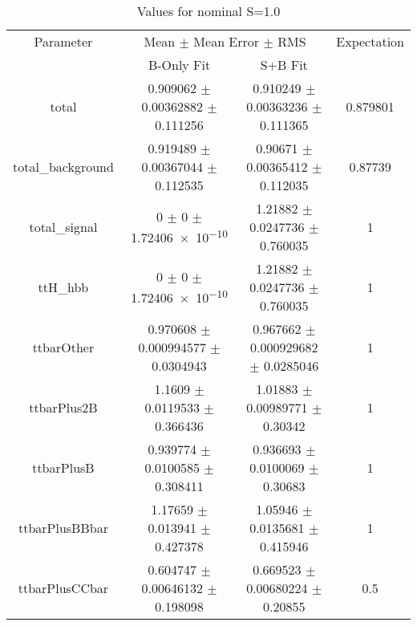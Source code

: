 \begin{table}
\centering
\caption{Values for nominal S=1.0}
\begin{tabular}{cccc}
\toprule
Parameter & \multicolumn{2}{c}{Mean $\pm$ Mean Error $\pm$ RMS} & Expectation\\
 & B-Only Fit & S+B Fit & \\
\midrule
total & \num{0.909062} $\pm$ \num{0.00362882} $\pm$ \num{0.111256} & \num{0.910249} $\pm$ \num{0.00363236} $\pm$ \num{0.111365} & \num{0.879801}\\
total\_background & \num{0.919489} $\pm$ \num{0.00367044} $\pm$ \num{0.112535} & \num{0.90671} $\pm$ \num{0.00365412} $\pm$ \num{0.112035} & \num{0.87739}\\
total\_signal & \num{0} $\pm$ \num{0} $\pm$ \num{1.72406e-10} & \num{1.21882} $\pm$ \num{0.0247736} $\pm$ \num{0.760035} & \num{1}\\
ttH\_hbb & \num{0} $\pm$ \num{0} $\pm$ \num{1.72406e-10} & \num{1.21882} $\pm$ \num{0.0247736} $\pm$ \num{0.760035} & \num{1}\\
ttbarOther & \num{0.970608} $\pm$ \num{0.000994577} $\pm$ \num{0.0304943} & \num{0.967662} $\pm$ \num{0.000929682} $\pm$ \num{0.0285046} & \num{1}\\
ttbarPlus2B & \num{1.1609} $\pm$ \num{0.0119533} $\pm$ \num{0.366436} & \num{1.01883} $\pm$ \num{0.00989771} $\pm$ \num{0.30342} & \num{1}\\
ttbarPlusB & \num{0.939774} $\pm$ \num{0.0100585} $\pm$ \num{0.308411} & \num{0.936693} $\pm$ \num{0.0100069} $\pm$ \num{0.30683} & \num{1}\\
ttbarPlusBBbar & \num{1.17659} $\pm$ \num{0.013941} $\pm$ \num{0.427378} & \num{1.05946} $\pm$ \num{0.0135681} $\pm$ \num{0.415946} & \num{1}\\
ttbarPlusCCbar & \num{0.604747} $\pm$ \num{0.00646132} $\pm$ \num{0.198098} & \num{0.669523} $\pm$ \num{0.00680224} $\pm$ \num{0.20855} & \num{0.5}\\
\bottomrule
\end{tabular}
\end{table}